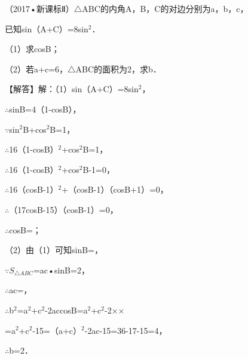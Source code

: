 \begin{question}
（2017•新课标Ⅱ）$\triangle$ABC的内角A，B，C的对边分别为a，b，c，\par
已知sin（A+C）=8sin$^{2}$\allowbreak{}．\par
（1）求cosB；\par
（2）若a+c=6，$\triangle$ABC的面积为2，求b．\par
\begin{solution}
【解答】解：（1）sin（A+C）=8sin$^{2}$\allowbreak{}，\par
$\therefore$sinB=4（1-cosB），\par
$\because$sin$^{2}$B+cos$^{2}$B=1，\par
$\therefore$16（1-cosB）$^{2}$+cos$^{2}$B=1，\par
$\therefore$16（1-cosB）$^{2}$+cos$^{2}$B-1=0，\par
$\therefore$16（cosB-1）$^{2}$+（cosB-1）（cosB+1）=0，\par
$\therefore$（17cosB-15）（cosB-1）=0，\par
$\therefore$cosB=\allowbreak{}；\par
（2）由（1）可知sinB=\allowbreak{}，\par
$\because$$S_{\triangle ABC}$=\allowbreak{}ac•sinB=2，\par
$\therefore$ac=\allowbreak{}，\par
$\therefore$b$^{2}$=a$^{2}$+c$^{2}$-2accosB=a$^{2}$+c$^{2}$-2×\allowbreak{}×\allowbreak{}\par
=a$^{2}$+c$^{2}$-15=（a+c）$^{2}$-2ac-15=36-17-15=4，\par
$\therefore$b=2．\par
\end{solution}
\end{question}


